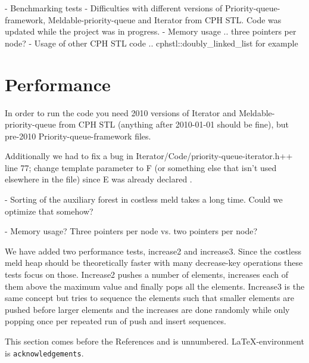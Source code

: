 \documentclass{DIKU-article}[2010/01/13]
\begin{document}
- Benchmarking tests
- Difficulties with different versions of Priority-queue-framework,
  Meldable-priority-queue and Iterator from CPH STL. Code was updated while the
  project was in progress.
- Memory usage .. three pointers per node?
- Usage of other CPH STL code .. cphstl::doubly\_linked\_list for example

\section{Performance}

In order to run the code you need 2010 versions of Iterator and
Meldable-priority-queue from CPH STL (anything after 2010-01-01 should be fine),
but pre-2010 Priority-queue-framework files.

Additionally we had to fix a bug in Iterator/Code/priority-queue-iterator.h++
line 77; change template parameter to F (or something else that isn't used
elsewhere in the file) since E was already declared .

- Sorting of the auxiliary forest in costless meld takes a long time. Could we
  optimize that somehow?

- Memory usage? Three pointers per node vs. two pointers per node?

We have added two performance tests, increase2 and increase3. Since the costless
meld heap should be theoretically faster with many decrease-key operations these
tests focus on those. Increase2 pushes a number of elements, increases each of
them above the maximum value and finally pops all the elements. Increase3 is the
same concept but tries to sequence the elements such that smaller elements are
pushed before larger elements and the increases are done randomly while only
popping once per repeated run of push and insert sequences.

\begin{acknowledgements}
This section comes before the References and is unnumbered.
\LaTeX-en\-viron\-ment is \verb|acknowledgements|.
\end{acknowledgements}


\end{document}
